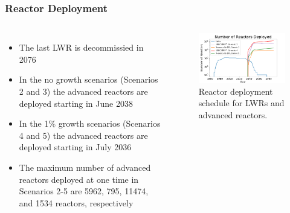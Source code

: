 \begin{frame}
    \frametitle{Reactor Deployment}
    \begin{columns}
        \column[t]{5cm}
        \begin{itemize}
            \item The last \gls{LWR} is decommissied in 2076
            \item In the no growth scenarios (Scenarios 2 and 3) the advanced reactors are 
                  deployed starting in June 2038
            \item In the 1\% growth scenarios (Scenarios 4 and 5) the advanced reactors are 
                  deployed starting in July 2036
            \item The maximum number of advanced reactors deployed at one time 
                  in Scenarios 2-5 are 5962, 795, 11474, and 1534 reactors, respectively
        \end{itemize}

        \column[t]{5cm}
        \vspace{-1cm}
        \begin{figure}
            \centering 
            \includegraphics[scale=0.3]{figures/rxdeployment_scenarios_all.png}
            \caption{Reactor deployment schedule for \glspl{LWR} and 
            advanced reactors.}
            \label{fig:rx_deployment}
        \end{figure}
    \end{columns}
\end{frame}

